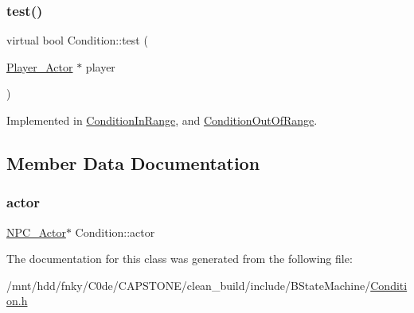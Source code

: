\subsubsection{\texorpdfstring{test()}{test()}}
{\footnotesize\ttfamily virtual bool Condition\+::test (\begin{DoxyParamCaption}\item[{\hyperlink{classPlayer__Actor}{Player\+\_\+\+Actor} $\ast$}]{player }\end{DoxyParamCaption})\hspace{0.3cm}{\ttfamily [pure virtual]}}



Implemented in \hyperlink{classConditionInRange_a64cc1a7816537a2d8e29972199b3e8f9}{Condition\+In\+Range}, and \hyperlink{classConditionOutOfRange_a8e09e943dedb3c8b482e5934975abc25}{Condition\+Out\+Of\+Range}.



\subsection{Member Data Documentation}
\mbox{\label{classCondition_a95c8585457c094a8564ac5111e66620d}} 
\subsubsection{\texorpdfstring{actor}{actor}}
{\footnotesize\ttfamily \hyperlink{classNPC__Actor}{N\+P\+C\+\_\+\+Actor}$\ast$ Condition\+::actor\hspace{0.3cm}{\ttfamily [protected]}}



The documentation for this class was generated from the following file\+:\begin{DoxyCompactItemize}
\item 
/mnt/hdd/fnky/\+C0de/\+C\+A\+P\+S\+T\+O\+N\+E/clean\+\_\+build/include/\+B\+State\+Machine/\hyperlink{Condition_8h}{Condition.\+h}\end{DoxyCompactItemize}
